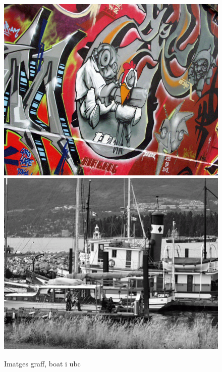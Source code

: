 		\begin{figure}[!htb]
				\includegraphics[width=\linewidth]{images/experiments/graf3}
				\label{fig:awesome_image1}
			\endminipage\hfill
				\includegraphics[width=\linewidth]{images/experiments/boat}
				\label{fig:awesome_image2}
			\endminipage
			\caption{Imatges graff, boat i ubc}
		\end{figure}

\newpage

